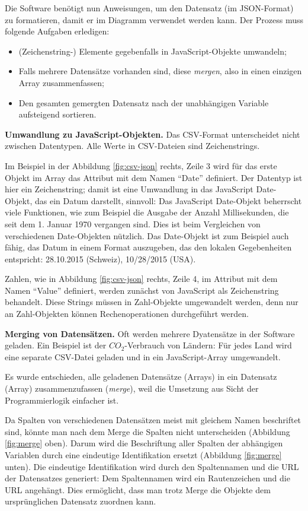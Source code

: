 Die Software benötigt nun Anweisungen, um den Datensatz (im JSON-Format) zu formatieren, damit er im Diagramm verwendet werden kann. Der Prozess muss folgende Aufgaben erledigen:

\begin{itemize}
	\item (Zeichenstring-) Elemente gegebenfalls in JavaScript-Objekte umwandeln;
	\item Falls mehrere Datensätze vorhanden sind, diese \textit{mergen}, also in einen einzigen Array zusammenfassen;
	\item Den gesamten gemergten Datensatz nach der unabhängigen Variable aufsteigend sortieren.
\end{itemize}

\textbf{Umwandlung zu JavaScript-Objekten.} Das CSV-Format unterscheidet nicht zwischen Datentypen. Alle Werte in CSV-Dateien sind Zeichenstrings.

Im Beispiel in der Abbildung \ref{fig:csv-json} rechts, Zeile 3 wird für das erste Objekt im Array das Attribut mit dem Namen "`Date"' definiert. Der Datentyp ist hier ein Zeichenstring; damit ist eine Umwandlung in das JavaScript Date-Objekt, das ein Datum darstellt, sinnvoll: Das JavaScript Date-Objekt beherrscht viele Funktionen, wie zum Beispiel die Ausgabe der Anzahl Millisekunden, die seit dem 1. Januar 1970 vergangen sind. Dies ist beim Vergleichen von verschiedenen Date-Objekten nützlich. Das Date-Objekt ist zum Beispiel auch fähig, das Datum in einem Format auszugeben, das den lokalen Gegebenheiten entspricht: 28.10.2015 (Schweiz), 10/28/2015 (USA).

Zahlen, wie in Abbildung \ref{fig:csv-json} rechts, Zeile 4, im Attribut mit dem Namen "`Value"' definiert, werden zunächst von JavaScript als Zeichenstring behandelt. Diese Strings müssen in Zahl-Objekte umgewandelt werden, denn nur an Zahl-Objekten können Rechenoperationen durchgeführt werden.

\textbf{Merging von Datensätzen.} Oft werden mehrere Dyatensätze in der Software geladen. Ein Beispiel ist der $CO_2$-Verbrauch von Ländern: Für jedes Land wird eine separate CSV-Datei geladen und in ein JavaScript-Array umgewandelt.

Es wurde entschieden, alle geladenen Datensätze (Arrays) in ein Datensatz (Array) zusammenzufassen (\textit{merge}), weil die Umsetzung aus Sicht der Programmierlogik einfacher ist. 

Da Spalten von verschiedenen Datensätzen meist mit gleichem Namen beschriftet sind, könnte man nach dem Merge die Spalten nicht unterscheiden (Abbildung \ref{fig:merge} oben). Darum wird die Beschriftung aller Spalten der abhängigen Variablen durch eine eindeutige Identifikation ersetzt (Abbildung \ref{fig:merge} unten). Die eindeutige Identifikation wird durch den Spaltennamen und die URL der Datensatzes generiert: Dem Spaltennamen wird ein Rautenzeichen und die URL angehängt. Dies ermöglicht, dass man trotz Merge die Objekte dem ursprünglichen Datensatz zuordnen kann.


